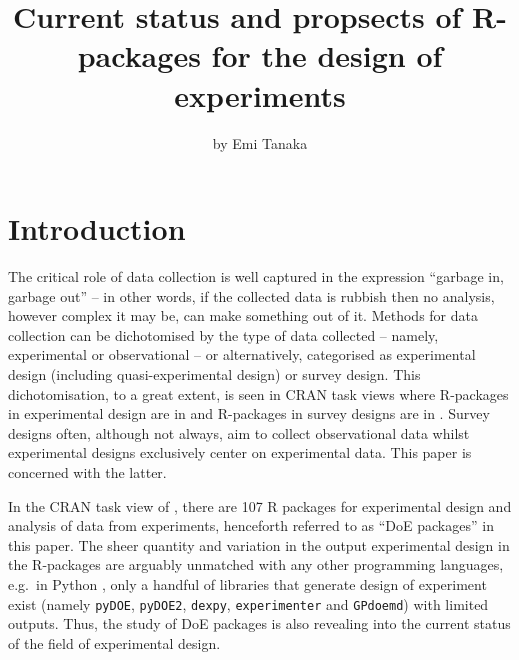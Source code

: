 \title{Current status and propsects of R-packages for the design of
experiments}
\author{by Emi Tanaka}

\maketitle


\hypertarget{introduction}{%
\section{Introduction}\label{introduction}}

The critical role of data collection is well captured in the expression
``garbage in, garbage out'' -- in other words, if the collected data is
rubbish then no analysis, however complex it may be, can make something
out of it. Methods for data collection can be dichotomised by the type
of data collected -- namely, experimental or observational -- or
alternatively, categorised as experimental design (including
quasi-experimental design) or survey design. This dichotomisation, to a
great extent, is seen in CRAN task views where R-packages in
experimental design are in  and R-packages in
survey designs are in . Survey designs often,
although not always, aim to collect observational data whilst
experimental designs exclusively center on experimental data. This paper
is concerned with the latter.

In the CRAN task view of , there are 107 R
packages for experimental design and analysis of data from experiments,
henceforth referred to as ``DoE packages'' in this paper. The sheer
quantity and variation in the output experimental design in the
R-packages are arguably unmatched with any other programming languages,
e.g.~in Python \citep{python}, only a handful of libraries that generate
design of experiment exist (namely \texttt{pyDOE}, \texttt{pyDOE2},
\texttt{dexpy}, \texttt{experimenter} and \texttt{GPdoemd}) with limited
outputs. Thus, the study of DoE packages is also revealing into the
current status of the field of experimental design.


